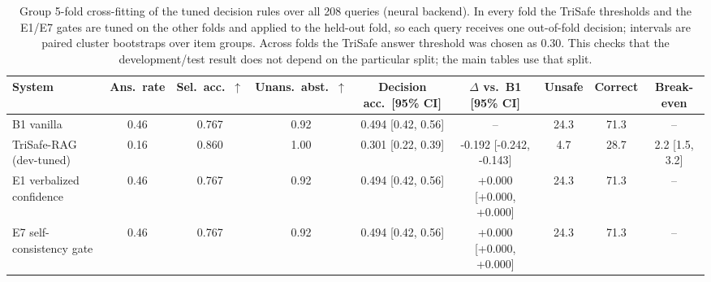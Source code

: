 \begin{table}[t]
  \caption{Group 5-fold cross-fitting of the tuned decision rules over all 208 queries (neural backend). In every fold the TriSafe thresholds and the E1/E7 gates are tuned on the other folds and applied to the held-out fold, so each query receives one out-of-fold decision; intervals are paired cluster bootstraps over item groups. Across folds the TriSafe answer threshold was chosen as 0.30. This checks that the development/test result does not depend on the particular split; the main tables use that split.}
  \label{tab:cv-neural}
  \footnotesize
  \setlength{\tabcolsep}{4pt}
  \begin{tabular}{lcccccccc}
    \toprule
    System & Ans.\ rate & Sel.\ acc.\ $\uparrow$ & Unans.\ abst.\ $\uparrow$ & Decision acc.\ [95\% CI] & $\Delta$ vs.\ B1 [95\% CI] & Unsafe & Correct & Break-even \\
    \midrule
    B1 vanilla & 0.46 & 0.767 & 0.92 & 0.494 [0.42, 0.56] & -- & 24.3 & 71.3 & -- \\
    TriSafe-RAG (dev-tuned) & 0.16 & 0.860 & 1.00 & 0.301 [0.22, 0.39] & -0.192 [-0.242, -0.143] & 4.7 & 28.7 & 2.2 [1.5, 3.2] \\
    E1 verbalized confidence & 0.46 & 0.767 & 0.92 & 0.494 [0.42, 0.56] & +0.000 [+0.000, +0.000] & 24.3 & 71.3 & -- \\
    E7 self-consistency gate & 0.46 & 0.767 & 0.92 & 0.494 [0.42, 0.56] & +0.000 [+0.000, +0.000] & 24.3 & 71.3 & -- \\
    \bottomrule
  \end{tabular}
\end{table}
